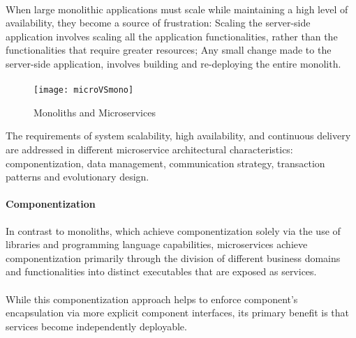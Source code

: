 \paragraph{}

When large monolithic applications must scale while maintaining a high level of availability, they become a source of frustration:
Scaling the server-side application involves scaling all the application functionalities, rather than the functionalities that require greater resources;
Any small change made to the server-side application, involves building and re-deploying the entire monolith.

\paragraph{}

\begin{figure}[htbp]
    \centering
    \texttt{[image: microVSmono]}
    \caption{Monoliths and Microservices \cite{microservices}}
    \label{fig:monoliths and microservices}
\end{figure}

The requirements of system scalability, high availability, and continuous delivery are addressed in different microservice architectural characteristics:
componentization, data management, communication strategy, transaction patterns and evolutionary design.

\paragraph{Componentization}

In contrast to monoliths, which achieve componentization solely via the use of libraries and programming language capabilities,
microservices achieve componentization primarily through the division of different business domains and functionalities into distinct executables
that are exposed as services.

\paragraph{}

While this componentization approach helps to enforce component's encapsulation via more explicit component interfaces,
its primary benefit is that services become independently deployable.

\paragraph{}

